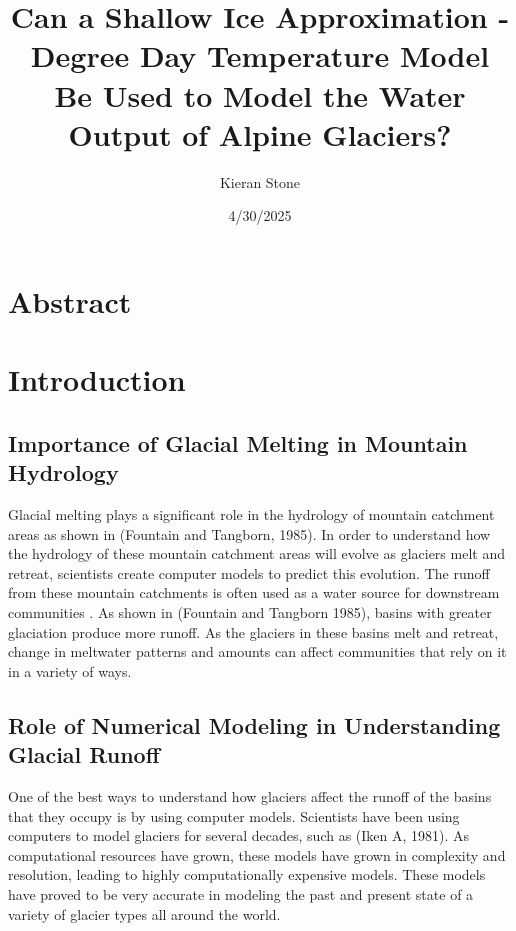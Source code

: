\documentclass{article}
\title{Can a Shallow Ice Approximation - Degree Day Temperature Model Be Used to Model the Water Output of Alpine Glaciers?}
\author{Kieran Stone}
\date{4/30/2025}
\begin{document}
\maketitle

\section*{Abstract}

\section{Introduction}
\subsection{Importance of Glacial Melting in Mountain Hydrology}
Glacial melting plays a significant role in the hydrology of mountain catchment areas as shown in (Fountain and Tangborn, 1985). In order to 
understand how the hydrology of these mountain catchment areas will evolve as glaciers melt and retreat, scientists create computer models to predict 
this evolution. The runoff from these mountain catchments is often used as a water source for downstream communities \cite{ref1}. As shown in 
(Fountain and Tangborn 1985), basins with greater glaciation produce more runoff. As the glaciers in these basins melt and retreat, 
change in meltwater patterns and amounts can affect communities that rely on it in a variety of ways.

\subsection{Role of Numerical Modeling in Understanding Glacial Runoff}
One of the best ways to understand how glaciers affect the runoff of the basins that they occupy is by using computer models. 
Scientists have been using computers to model glaciers for several decades, 
such as (Iken A, 1981). As computational resources have grown, these models have grown in complexity and resolution, leading 
to highly computationally expensive models. These models have proved to be very accurate in modeling the past and present state of a variety 
of glacier types all around the world.
\end{document}
